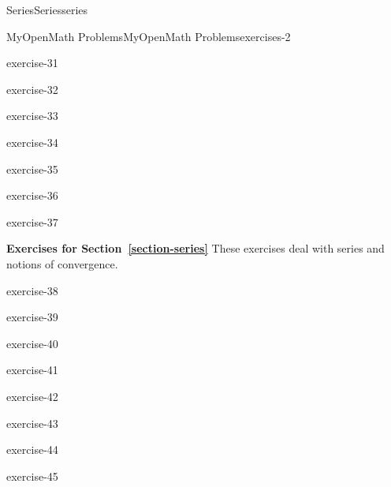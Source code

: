 \documentclass[oneside,10pt,]{book}
\numberwithin{equation}{section}
\begin{document}
\begin{chapterptx}{Series}{}{Series}{}{}{series}
\begin{exercises-section}{MyOpenMath Problems}{}{MyOpenMath Problems}{}{}{exercises-2}
\begin{exercisegroup}
\begin{divisionexerciseeg}{4}{}{}{exercise-31}%
\end{divisionexerciseeg}%
\begin{divisionexerciseeg}{5}{}{}{exercise-32}%
\end{divisionexerciseeg}%
\begin{divisionexerciseeg}{6}{}{}{exercise-33}%
\end{divisionexerciseeg}%
\begin{divisionexerciseeg}{7}{}{}{exercise-34}%
\end{divisionexerciseeg}%
\begin{divisionexerciseeg}{8}{}{}{exercise-35}%
\end{divisionexerciseeg}%
\begin{divisionexerciseeg}{9}{}{}{exercise-36}%
\end{divisionexerciseeg}%
\begin{divisionexerciseeg}{10}{}{}{exercise-37}%
\end{divisionexerciseeg}%
\end{exercisegroup}
\par\medskip\noindent
\par\medskip\noindent%
\textbf{Exercises for Section~\ref*{section-series}}\space\space\hypertarget{exercisegroup-9}{}%
\hypertarget{p-985}{}%
These exercises deal with series and notions of convergence.%
\begin{exercisegroup}
\begin{divisionexerciseeg}{11}{}{}{exercise-38}%
\end{divisionexerciseeg}%
\begin{divisionexerciseeg}{12}{}{}{exercise-39}%
\end{divisionexerciseeg}%
\begin{divisionexerciseeg}{13}{}{}{exercise-40}%
\end{divisionexerciseeg}%
\begin{divisionexerciseeg}{14}{}{}{exercise-41}%
\end{divisionexerciseeg}%
\begin{divisionexerciseeg}{15}{}{}{exercise-42}%
\end{divisionexerciseeg}%
\begin{divisionexerciseeg}{16}{}{}{exercise-43}%
\end{divisionexerciseeg}%
\begin{divisionexerciseeg}{17}{}{}{exercise-44}%
\end{divisionexerciseeg}%
\begin{divisionexerciseeg}{18}{}{}{exercise-45}%

\end{divisionexerciseeg}
\end{exercisegroup}
\end{exercises-section}
\end{chapterptx}
\end{document}
